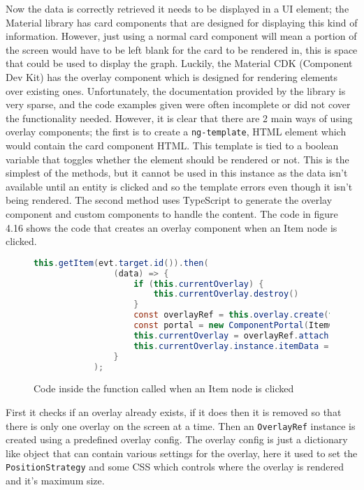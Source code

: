 Now the data is correctly retrieved it needs to be displayed in a UI element; the Material library has card components that are 
designed for displaying this kind of information. However, just using a normal card component will mean a portion of the screen 
would have to be left blank for the card to be rendered in, this is space that could be used to display the graph. Luckily, the Material CDK (Component Dev Kit) 
has the overlay component which is designed for rendering elements over existing ones. Unfortunately, the documentation provided by 
the library is very sparse, and the code examples given were often incomplete or did not cover the functionality needed. 
However, it is clear that there are 2 main ways of using overlay components; the first is to create a \verb|ng-template|, 
HTML element which would contain the card component HTML. This template is tied to a boolean variable that toggles whether the element should be rendered or not.
This is the simplest of the methods, but it cannot be used in this instance as the data isn't available until an entity is clicked and so the template errors 
even though it isn't being rendered. The second method uses TypeScript to generate the overlay component and custom components to handle the content. 
The code in figure 4.16 shows the code that creates an overlay component when an Item node is clicked.
\begin{figure}[H]
    \begin{lstlisting}[language=Java]
        this.getItem(evt.target.id()).then(
                (data) => {
                    if (this.currentOverlay) {
                        this.currentOverlay.destroy()
                    }
                    const overlayRef = this.overlay.create(this.overlayConfig);
                    const portal = new ComponentPortal(ItemComponent);
                    this.currentOverlay = overlayRef.attach(portal);
                    this.currentOverlay.instance.itemData = data;
                }
            );
    \end{lstlisting}
    \caption{Code inside the function called when an Item node is clicked}
\end{figure}
First it checks if an overlay already exists, if it does then it is removed so that there is only one overlay on the screen at a time. 
Then an \verb|OverlayRef| instance is created using a predefined overlay config. The overlay config is just a dictionary like object that can contain 
various settings for the overlay, here it used to set the \verb|PositionStrategy| and some CSS which controls where the overlay is rendered and it's maximum size.
